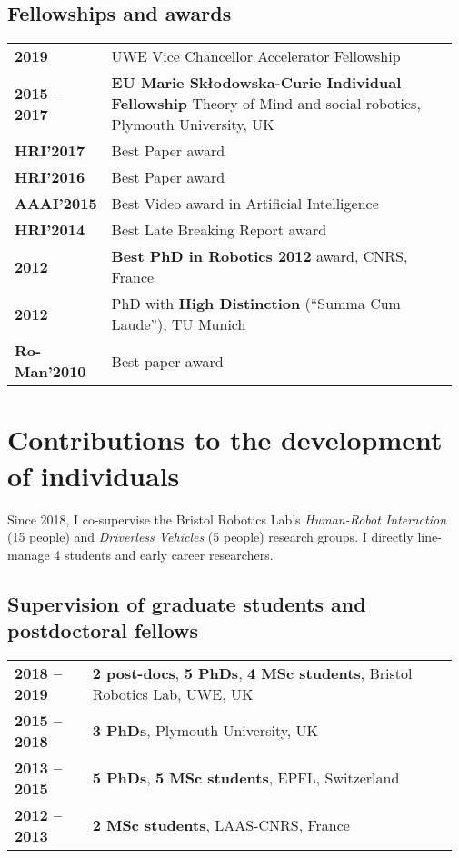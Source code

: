 \subsection{Fellowships and awards}

\begin{tabular}{p{0.17\linewidth}p{0.8\linewidth}}
    \bf 2019 & UWE Vice Chancellor Accelerator Fellowship \\
    \bf 2015 -- 2017 & {\bf EU Marie Skłodowska-Curie Individual Fellowship}
    \newline Theory of Mind and social robotics, Plymouth University, UK \\
    \bf HRI'2017  & Best Paper award\\
    \bf HRI'2016  & Best Paper award\\
    \bf AAAI'2015  & Best Video award in Artificial Intelligence\\
    \bf HRI'2014  & Best Late Breaking Report award\\
    \bf 2012         & {\bf Best PhD in Robotics 2012} award, CNRS, France \\
    \bf 2012         & PhD with {\bf High Distinction} (“Summa Cum Laude”), TU Munich\\
    \bf Ro-Man'2010  & Best paper award\\
\end{tabular}

\vspace{2em}
\section{Contributions to the development of individuals}

Since 2018, I co-supervise the Bristol Robotics Lab's \emph{Human-Robot Interaction} (15 people) and \emph{Driverless Vehicles} (5 people) research groups.
I directly line-manage 4 students and early career researchers.\\

\subsection{Supervision of graduate students and postdoctoral fellows}

\begin{tabular}{p{0.17\linewidth}p{0.8\linewidth}}
    \bf 2018 -- 2019 & \textbf{2 post-docs}, \textbf{5 PhDs}, \textbf{4 MSc students}, Bristol Robotics Lab, UWE, UK \\
    \bf 2015 -- 2018 & \textbf{3 PhDs}, Plymouth University, UK \\
    \bf 2013 -- 2015 & \textbf{5 PhDs}, \textbf{5 MSc students}, EPFL, Switzerland \\
    \bf 2012 -- 2013 & \textbf{2 MSc students}, LAAS-CNRS, France \\
\end{tabular}



